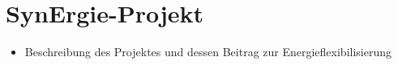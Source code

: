 \section{SynErgie-Projekt}
\label{ch_04SynErgie-Projekt}
\begin{itemize}
	\item Beschreibung des Projektes und dessen Beitrag zur Energieflexibilisierung
\end{itemize}